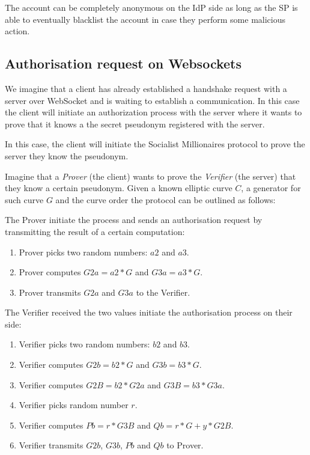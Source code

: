The account can be completely anonymous on the IdP side as long as the SP is able to eventually blacklist the account in case they perform some malicious action.
 
\subsection{Authorisation request on Websockets}

We imagine that a client has already established a handshake request with a server over WebSocket and is waiting to establish a communication. In this case the client will initiate an authorization process with the server where it wants to prove that it knows a the secret pseudonym registered with the server.

In this case, the client will initiate the Socialist Millionaires protocol to prove the server they know the pseudonym.

Imagine that a \emph{Prover} (the client) wants to prove the \emph{Verifier} (the server) that they know a certain pseudonym. Given a known elliptic curve $C$, a generator for such curve $G$ and the curve order the protocol can be outlined as follows:

The Prover initiate the process and sends an authorisation request by transmitting the result of a certain computation:
\begin{enumerate}
    \item Prover picks two random numbers: $a2$ and $a3$.
    \item Prover computes $G2a = a2 * G$ and $G3a = a3 * G$.
    \item Prover transmits $G2a$ and $G3a$ to the Verifier.
\end{enumerate}

The Verifier received the two values initiate the authorisation process on their side:
\begin{enumerate}
    \item Verifier picks two random numbers: $b2$ and $b3$. 
    \item Verifier computes $G2b = b2 * G$ and $G3b = b3 * G$.
    \item Verifier computes $G2B = b2 * G2a$ and $G3B = b3 * G3a$.
    \item Verifier picks random number $r$.
    \item Verifier computes $Pb = r * G3B$ and $Qb = r * G + y * G2B$.
    \item Verifier transmits $G2b$, $G3b$, $Pb$ and $Qb$ to Prover.
\end{enumerate}

